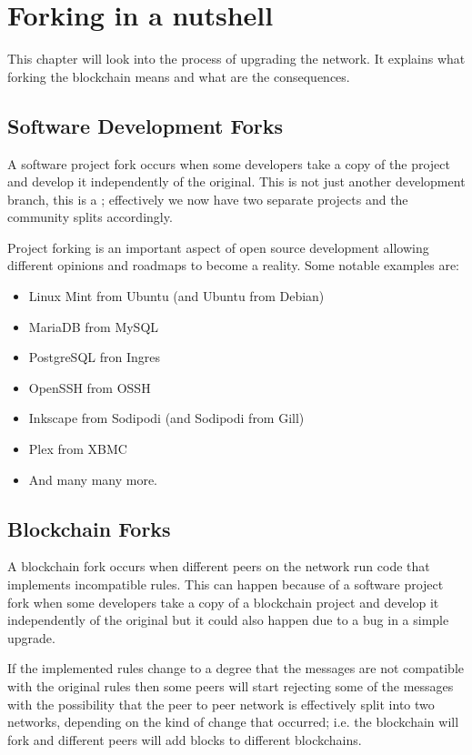 \chapter{Forking in a nutshell}
\label{ch:forking}

\begin{summary}
This chapter will look into the process of upgrading the network. It explains what forking the blockchain means and what are the consequences.
\end{summary}

\section{Software Development Forks}
A software project fork occurs when some developers take a copy of the project and develop it independently of the original. This is not just another development branch, this is a ; effectively we now have two separate projects and the community splits accordingly.

Project forking is an important aspect of open source development allowing different opinions and roadmaps to become a reality. Some notable examples are:

\begin{itemize}
\item Linux Mint from Ubuntu (and Ubuntu from Debian)
\item MariaDB from MySQL
\item PostgreSQL fron Ingres
\item OpenSSH from OSSH
\item Inkscape from Sodipodi (and Sodipodi from Gill)
\item Plex from XBMC
\item And many many more.
\end{itemize}

\section{Blockchain Forks}
A blockchain fork occurs when different peers on the network run code that implements incompatible rules. This can happen because of a software project fork when some developers take a copy of a blockchain project and develop it independently of the original but it could also happen due to a bug in a simple upgrade.

If the implemented rules change to a degree that the messages are not compatible with the original rules then some peers will start rejecting some of the messages with the possibility that the peer to peer network is effectively split into two networks, depending on the kind of change that occurred; i.e. the blockchain will fork and different peers will add blocks to different blockchains.

